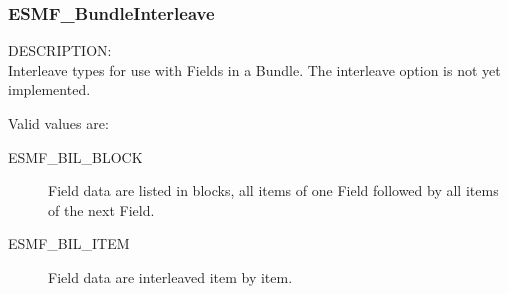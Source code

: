 

\subsubsection{ESMF\_BundleInterleave}
\label{opt:bundleinterleave}
{\sf DESCRIPTION:\\}
Interleave types for use with Fields in a Bundle.  The interleave option 
is not yet implemented.

Valid values are:
\begin{description}
   \item [ESMF\_BIL\_BLOCK]
         Field data are listed in blocks, all items of one Field followed
         by all items of the next Field.
   \item [ESMF\_BIL\_ITEM]
         Field data are interleaved item by item.
\end{description}


